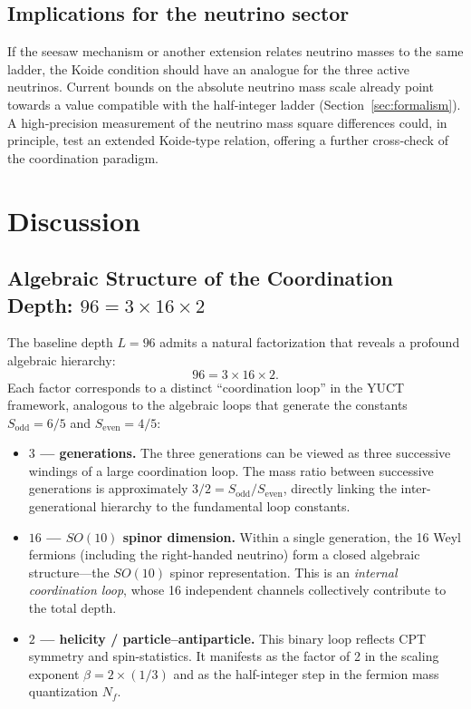 \documentclass[11pt,a4paper]{article}
\newcommand{\Sodd}{S_{\mathrm{odd}}}
\newcommand{\Seven}{S_{\mathrm{even}}}
\begin{document}
\subsection{Implications for the neutrino sector}

If the seesaw mechanism or another extension relates neutrino masses to
the same ladder, the Koide condition should have an analogue for the three
active neutrinos.  Current bounds on the absolute neutrino mass scale
already point towards a value compatible with the half‑integer ladder
(Section~\ref{sec:formalism}).  A high‑precision measurement of the
neutrino mass square differences could, in principle, test an extended
Koide‑type relation, offering a further cross‑check of the coordination
paradigm.

	\section{Discussion}
	\label{sec:discussion}
	
	\subsection{Algebraic Structure of the Coordination Depth: \(96 = 3 \times 16 \times 2\)}
	
	The baseline depth \(L = 96\) admits a natural factorization that reveals a profound algebraic hierarchy:
	\[
	96 = 3 \times 16 \times 2.
	\]
	Each factor corresponds to a distinct ``coordination loop'' in the YUCT framework, analogous to the algebraic loops that generate the constants \(\Sodd = 6/5\) and \(\Seven = 4/5\):
	
	\begin{itemize}
		\item \textbf{\(3\) — generations.} The three generations can be viewed as three successive windings of a large coordination loop. The mass ratio between successive generations is approximately \(3/2 = \Sodd/\Seven\), directly linking the inter-generational hierarchy to the fundamental loop constants.
		\item \textbf{\(16\) — \(SO(10)\) spinor dimension.} Within a single generation, the 16 Weyl fermions (including the right-handed neutrino) form a closed algebraic structure—the \(SO(10)\) spinor representation. This is an \emph{internal coordination loop}, whose 16 independent channels collectively contribute to the total depth.
		\item \textbf{\(2\) — helicity / particle–antiparticle.} This binary loop reflects CPT symmetry and spin-statistics. It manifests as the factor of 2 in the scaling exponent \(\beta = 2 \times (1/3)\) and as the half-integer step in the fermion mass quantization \(N_f\).
	\end{itemize}
	
\end{document}
